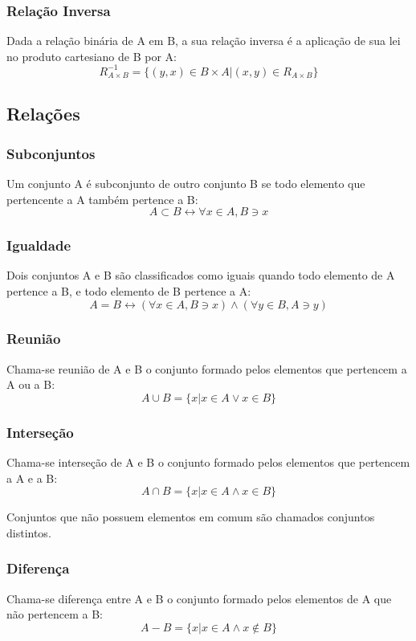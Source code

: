     \subsubsection{Relação Inversa}
        Dada a relação binária de A em B, a sua relação inversa é a aplicação de sua lei no produto cartesiano de B por A:
        \[ R^{-1}_{A \times B} = \{ (y,x) \in B \times A | (x,y) \in R_{A \times B} \} \]
\subsection{Relações}
    \subsubsection{Subconjuntos}
        Um conjunto A é subconjunto de outro conjunto B se todo elemento que pertencente a A também pertence a B:
        \[ A \subset B \leftrightarrow \forall x \in A, B \ni x \]
    \subsubsection{Igualdade}
        Dois conjuntos A e B são classificados como iguais quando todo elemento de A pertence a B, e todo elemento de B pertence a A:
        \[ A = B \leftrightarrow (\forall x \in A, B \ni x) \wedge (\forall y \in B, A \ni y) \]
    \subsubsection{Reunião}
        Chama-se reunião de A e B o conjunto formado pelos elementos que pertencem a A ou a B:
        \[ A \cup B = \{ x | x \in A \vee x \in B \} \]
    \subsubsection{Interseção}
        Chama-se interseção de A e B o conjunto formado pelos elementos que pertencem a A e a B:
        \[ A \cap B = \{ x | x \in A \wedge x \in B \} \]

        Conjuntos que não possuem elementos em comum são chamados conjuntos distintos.
    \subsubsection{Diferença}
        Chama-se diferença entre A e B o conjunto formado pelos elementos de A que não pertencem a B:
        \[ A - B = \{ x | x \in A \wedge x \notin B \} \]
